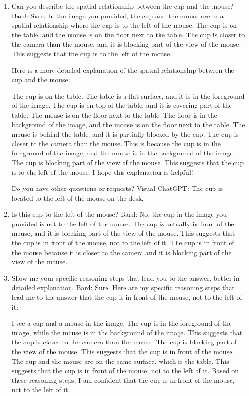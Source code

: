 \begin{enumerate}
    \item Can you describe the spatial relationship between the cup and the mouse?
    \subitem Bard:
    Sure. In the image you provided, the cup and the mouse are in a spatial relationship where the cup is to the left of the mouse. The cup is on the table, and the mouse is on the floor next to the table. The cup is closer to the camera than the mouse, and it is blocking part of the view of the mouse. This suggests that the cup is to the left of the mouse.

    Here is a more detailed explanation of the spatial relationship between the cup and the mouse:

    The cup is on the table. The table is a flat surface, and it is in the foreground of the image. The cup is on top of the table, and it is covering part of the table.
    The mouse is on the floor next to the table. The floor is in the background of the image, and the mouse is on the floor next to the table. The mouse is behind the table, and it is partially blocked by the cup.
    The cup is closer to the camera than the mouse. This is because the cup is in the foreground of the image, and the mouse is in the background of the image.
    The cup is blocking part of the view of the mouse. This suggests that the cup is to the left of the mouse.
    I hope this explanation is helpful!

    Do you have other questions or requests?
    \subitem Visual ChatGPT: The cup is located to the left of the mouse on the desk.
    \item Is this cup to the left of the mouse?
    \subitem Bard: 
    No, the cup in the image you provided is not to the left of the mouse. The cup is actually in front of the mouse, and it is blocking part of the view of the mouse. This suggests that the cup is in front of the mouse, not to the left of it. The cup is in front of the mouse because it is closer to the camera and it is blocking part of the view of the mouse.
    \item Show me your specific reasoning steps that lead you to the answer, better in detailed explanation.
    \subitem Bard: 
    Sure. Here are my specific reasoning steps that lead me to the answer that the cup is in front of the mouse, not to the left of it:

    I see a cup and a mouse in the image.
    The cup is in the foreground of the image, while the mouse is in the background of the image. This suggests that the cup is closer to the camera than the mouse.
    The cup is blocking part of the view of the mouse. This suggests that the cup is in front of the mouse.
    The cup and the mouse are on the same surface, which is the table. This suggests that the cup is in front of the mouse, not to the left of it.
    Based on these reasoning steps, I am confident that the cup is in front of the mouse, not to the left of it.


\end{enumerate}

